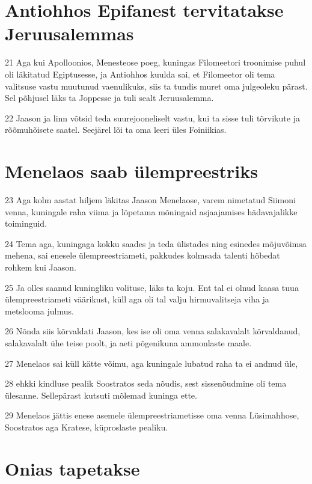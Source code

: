 \section*{Antiohhos Epifanest tervitatakse Jeruusalemmas}

\par 21 Aga kui Apolloonios, Menesteose poeg, kuningas Filomeetori troonimise puhul oli läkitatud Egiptusesse, ja Antiohhos kuulda sai, et Filomeetor oli tema valitsuse vastu muutunud vaenulikuks, siis ta tundis muret oma julgeoleku pärast. Sel põhjusel läks ta Joppesse ja tuli sealt Jeruusalemma.
\par 22 Jaason ja linn võtsid teda suurejooneliselt vastu, kui ta sisse tuli tõrvikute ja rõõmuhõisete saatel. Seejärel lõi ta oma leeri üles Foiniikias.


\section*{Menelaos saab ülempreestriks}

\par 23 Aga kolm aastat hiljem läkitas Jaason Menelaose, varem nimetatud Siimoni venna, kuningale raha viima ja lõpetama mõningaid asjaajamises hädavajalikke toiminguid.
\par 24 Tema aga, kuningaga kokku saades ja teda ülistades ning esinedes mõjuvõimsa mehena, sai enesele ülempreestriameti, pakkudes kolmsada talenti hõbedat rohkem kui Jaason.
\par 25 Ja olles saanud kuningliku volituse, läks ta koju. Ent tal ei olnud kaasa tuua ülempreestriameti väärikust, küll aga oli tal valju hirmuvalitseja viha ja metslooma julmus.
\par 26 Nõnda siis kõrvaldati Jaason, kes ise oli oma venna salakavalalt kõrvaldanud, salakavalalt ühe teise poolt, ja aeti põgenikuna ammonlaste maale.
\par 27 Menelaos sai küll kätte võimu, aga kuningale lubatud raha ta ei andnud üle,
\par 28 ehkki kindluse pealik Soostratos seda nõudis, sest sissenõudmine oli tema ülesanne. Sellepärast kutsuti mõlemad kuninga ette.
\par 29 Menelaos jättis enese asemele ülempreestriametisse oma venna Lüsimahhose, Soostratos aga Kratese, küproslaste pealiku.


\section*{Onias tapetakse}

